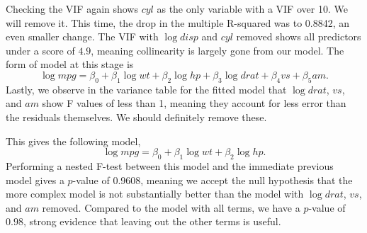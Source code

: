 \documentclass[a4paper]{article}
\begin{document}
Checking the VIF again shows \(cyl\) as the only variable with a VIF over 10. We will remove it.
This time, the drop in the multiple R-squared was to 0.8842, an even smaller change. The VIF 
with \(\log disp\) and \(cyl\) removed shows all predictors under a score of \(4.9\), meaning collinearity is largely gone from our model. The form of model at this stage is 
\begin{equation}
\log mpg = \beta_0 + \beta_1 \log wt + \beta_2\log hp + \beta_3 \log drat + \beta_4 vs + \beta_5 am.
\end{equation}
Lastly, we observe in the variance table for the fitted model that \(\log drat\), \(vs\), and \(am\) show F values of less than 1, meaning they account for less error than the residuals themselves. We should definitely remove these. 

This gives the following model, 
\begin{equation}
	\log mpg = \beta_0 + \beta_1 \log wt + \beta_2 \log hp.
\end{equation}
Performing a nested F-test between this model and the immediate previous model gives a \(p\)-value of 0.9608, meaning we accept the null hypothesis that the more complex model is not substantially better than the model with \(\log drat\), \(vs\), and \(am\) removed. Compared to the model with all terms, we have a \(p\)-value of \(0.98\), strong evidence that leaving out the other terms is useful.
\end{document}
